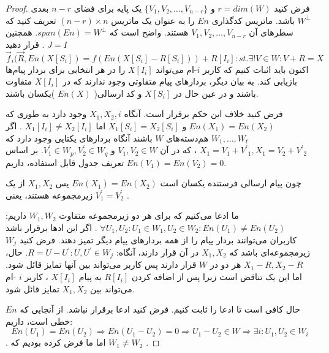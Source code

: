 \begin{proof}
    فرض کنید 
    $r = dim(W)$
     و 
     $\{V_1, V_2, \ldots, V_{n - r} \}$ 
     یک پایه برای فضای
      $n - r$
       بعدی 
      $W^\bot$
       باشد. ماتریس کدگذاری 
      $En$
       را به عنوان یک ماتریس 
     $(n - r) \times n $
      تعریف کنید که سطرهای آن 
      $V_1, V_2, \ldots, V_{n - r}$
       هستند. واضح است که 
      $span(En) = W^\bot$.
       همچنین 
       $J = I$ 
       . قرار دهید
       $$\overrightarrow{f}_i(\overrightarrow{R}, En(X[S_i]) = f(En(X[S_i] - R[S_i])) + R[I_i]: st.\exists! V \in W: V + R = X $$
      اکنون باید اثبات کنیم که کاربر $i$-ام می‌تواند $X[I_i]$ را در هر انتخابی برای بردار پیام‌ها بازیابی کند. به بیان دیگر، بردارهای پیام متفاوتی وجود ندارند که در 
    $X[I_i]$‌
    متفاوت باشند و در عین حال در
    $X[S_i]$
      و کد ارسالی(
       $En(X)$
       )یکسان باشند.
       
       فرض کنید خلاف این حکم برقرار است. آنگاه 
     $X_1, X_2, i$
      وجود دارد به طوری که 
     $En(X_1) = En(X_2)$
      و 
     $X_1[S_i] = X_2[S_i]$
      اما 
     $X_1[I_i] \neq X_2[I_i]$
     . اگر 
     $W_1, \ldots, W_t$
      هم‌دسته‌های 
     $W$
      باشند آنگاه بردارهای یکتایی وجود دارد که 
     $X_1 = V_1 + {V^\prime}_1, X_1 = V_2 + {V^\prime}_2$
     ، که در آن 
     $V_1, V_2 \in W$
      و 
      $V^\prime_1 \in W_p, V^\prime_2 \in W_q$.
    بر اساس تعریف جدول قابل استفاده، داریم
     $En(V_1) = En(V_2) = 0$.
    
    چون پیام ارسالی فرستنده یکسان است
    $En(X_1) = En(X_2)$
    پس
    $X_1, X_2$
     از یک زیرمجموعه هستند، یعنی 
    $V^\prime_1 = V^\prime_2$
    .
    
    ما ادعا می‌کنیم که برای هر دو زیرمجموعه متفاوت 
    $W_1, W_2$
     داریم: 
    $\forall U_1, U_2: U_1 \in W_1, U_2 \in W_2: En(U_1) \neq En(U_2)$
    . اگر این ادها برقرار باشد کاربران می‌توانند بردار پیام را از همه بردارهای پیام دیگر تمیز دهند. فرض کنید 
    $W_j$ 
    زیرمجموعه‌ای باشد که 
    $X_1, X_2$
     در آن قرار دارند، آنگاه: 
     $R = U - U^\prime: U, U^\prime \in W_j$. 
     حال، 
     $X_1 - R, X_2 - R$ 
     هر دو در 
     $W$
      قرار دارند پس کاربر می‌تواند بین آنها تمایز قائل شود. اما این یک تناقض است زیرا پس از اضافه کردن 
     $R[I_i]$
      به پیام 
     $X[I_i]$
     ، کاربر 
     $i$
     -ام می‌تواند بین $X_1, X_2$ تمایز قائل شود.
     
    حال کافی است تا ادعا را ثابت کنیم. فرض کنید ادعا برقرار نباشد. از آنجایی که $En$ خطی است، داریم: 
    $$En(U_1) = En(U_2) \Rightarrow En(U_1 - U_2) = 0 \Rightarrow U_1 - U_2 \in W \Rightarrow \exists i: U_1, U_2 \in W_i$$
    . اما ما فرض کرده بودیم که
     $W_1 \neq W_2$
     .
\end{proof}


